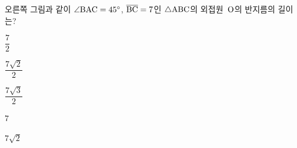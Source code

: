 \noindent\begin{minipage}[t]{0.58\linewidth}\vspace{0pt}\raggedright 오른쪽 그림과 같이 $\angle\mathrm{BAC}=45^\circ$, $\overline{\mathrm{BC}}=7$인 $\triangle\mathrm{ABC}$의 외접원~$\mathrm{O}$의 반지름의 길이는?\end{minipage}\hfill\begin{minipage}[t]{0.4\linewidth}\vspace{0pt}\centering \resizebox{\ifdim\width>\linewidth\linewidth\else\width\fi}{!}{}\end{minipage}\par
\begin{choicesii}{\rule[-3ex]{0pt}{8ex}$\dfrac{7}{2}$}{\rule[-3ex]{0pt}{8ex}$\dfrac{7\sqrt{2}}{2}$}{\rule[-3ex]{0pt}{8ex}$\dfrac{7\sqrt{3}}{2}$}{\rule[-3ex]{0pt}{8ex}$7$}{\rule[-3ex]{0pt}{8ex}$7\sqrt{2}$}\end{choicesii}
